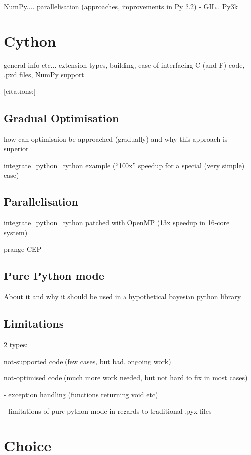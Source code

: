 \documentclass[a4paper,12pt,oneside]{report}
\begin{document}
NumPy.... parallelisation (approaches, improvements in Py 3.2) - GIL.. Py3k

\section{Cython}

general info etc... extension types, building, ease of interfacing C (and F) code, .pxd files,
NumPy support

[citations:\cite{BehBraSel:09,Sel:09,BehBraCitDalSelSmi:11}]

\subsection{Gradual Optimisation}

how can optimisaion be approached (gradually) and why this approach is superior

integrate\_python\_cython example (``100x'' speedup for a special (very simple) case)

\subsection{Parallelisation}

integrate\_python\_cython patched with OpenMP (13x speedup in 16-core system)

prange CEP

\subsection{Pure Python mode}

About it and why it should be used in a hypothetical bayesian python library

\subsection{Limitations}

2 types:

	not-supported code (few cases, but bad, ongoing work)

	not-optimised code (much more work needed, but not hard to fix in most cases)

		- exception handling (functions returning void etc)

		- limitations of pure python mode in regards to traditional .pyx files

\section{Choice}
\end{document}

